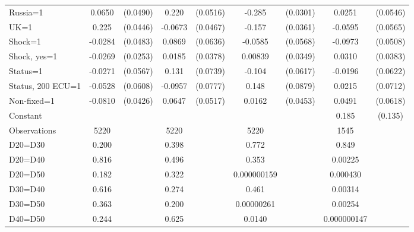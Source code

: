 \begin{tabular}{l|cccccc|cc}
Russia=1        &   0.0650         & (0.0490)&    0.220\sym{***}& (0.0516)&   -0.285\sym{***}& (0.0301)&   0.0251         & (0.0546)\\
UK=1            &    0.225\sym{***}& (0.0446)&  -0.0673         & (0.0467)&   -0.157\sym{***}& (0.0361)&  -0.0595         & (0.0565)\\
Shock=1         &  -0.0284         & (0.0483)&   0.0869         & (0.0636)&  -0.0585         & (0.0568)&  -0.0973\sym{*}  & (0.0508)\\
Shock, yes=1    &  -0.0269         & (0.0253)&   0.0185         & (0.0378)&  0.00839         & (0.0349)&   0.0310         & (0.0383)\\
Status=1        &  -0.0271         & (0.0567)&    0.131\sym{*}  & (0.0739)&   -0.104\sym{*}  & (0.0617)&  -0.0196         & (0.0622)\\
Status, 200 ECU=1&  -0.0528         & (0.0608)&  -0.0957         & (0.0777)&    0.148\sym{*}  & (0.0879)&   0.0215         & (0.0712)\\
Non-fixed=1     &  -0.0810\sym{*}  & (0.0426)&   0.0647         & (0.0517)&   0.0162         & (0.0453)&   0.0491         & (0.0618)\\
Constant        &                  &         &                  &         &                  &         &    0.185         &  (0.135)\\
\hline
Observations    &     5220         &         &     5220         &         &     5220         &         &     1545         &         \\
D20=D30         &    0.200         &         &    0.398         &         &    0.772         &         &    0.849         &         \\
D20=D40         &    0.816         &         &    0.496         &         &    0.353         &         &  0.00225         &         \\
D20=D50         &    0.182         &         &    0.322         &         &0.000000159         &         & 0.000430         &         \\
D30=D40         &    0.616         &         &    0.274         &         &    0.461         &         &  0.00314         &         \\
D30=D50         &    0.363         &         &    0.200         &         &0.00000261         &         &  0.00254         &         \\
D40=D50         &    0.244         &         &    0.625         &         &   0.0140         &         &0.000000147         &         \\

\end{tabular}
